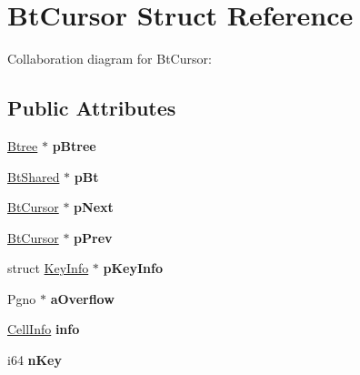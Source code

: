 \hypertarget{struct_bt_cursor}{\section{Bt\+Cursor Struct Reference}
\label{struct_bt_cursor}
}


Collaboration diagram for Bt\+Cursor\+:
\subsection*{Public Attributes}
\begin{DoxyCompactItemize}
\item 
\hypertarget{struct_bt_cursor_a2ad810542eaf99c9919c585624bead6f}{\hyperlink{struct_btree}{Btree} $\ast$ {\bfseries p\+Btree}}\label{struct_bt_cursor_a2ad810542eaf99c9919c585624bead6f}

\item 
\hypertarget{struct_bt_cursor_a61c245712549192f7644e5ac23c00b74}{\hyperlink{struct_bt_shared}{Bt\+Shared} $\ast$ {\bfseries p\+Bt}}\label{struct_bt_cursor_a61c245712549192f7644e5ac23c00b74}

\item 
\hypertarget{struct_bt_cursor_ad2f8fe3aa7d3fa3309692b3e8a8c2395}{\hyperlink{struct_bt_cursor}{Bt\+Cursor} $\ast$ {\bfseries p\+Next}}\label{struct_bt_cursor_ad2f8fe3aa7d3fa3309692b3e8a8c2395}

\item 
\hypertarget{struct_bt_cursor_ac4f788ee88f252ddfcef8804674c7c90}{\hyperlink{struct_bt_cursor}{Bt\+Cursor} $\ast$ {\bfseries p\+Prev}}\label{struct_bt_cursor_ac4f788ee88f252ddfcef8804674c7c90}

\item 
\hypertarget{struct_bt_cursor_ad2360bda13f959ed70672eb421fdb5ec}{struct \hyperlink{struct_key_info}{Key\+Info} $\ast$ {\bfseries p\+Key\+Info}}\label{struct_bt_cursor_ad2360bda13f959ed70672eb421fdb5ec}

\item 
\hypertarget{struct_bt_cursor_ae2dbcc15e63d349774a7ad6caef4d096}{Pgno $\ast$ {\bfseries a\+Overflow}}\label{struct_bt_cursor_ae2dbcc15e63d349774a7ad6caef4d096}

\item 
\hypertarget{struct_bt_cursor_a9934b348c6e9f4808d8f98ea78788fbe}{\hyperlink{struct_cell_info}{Cell\+Info} {\bfseries info}}\label{struct_bt_cursor_a9934b348c6e9f4808d8f98ea78788fbe}

\item 
\hypertarget{struct_bt_cursor_a23f6a271258c109aaeda0ba19e808f92}{i64 {\bfseries n\+Key}}\label{struct_bt_cursor_a23f6a271258c109aaeda0ba19e808f92}


\end{DoxyCompactItemize}
